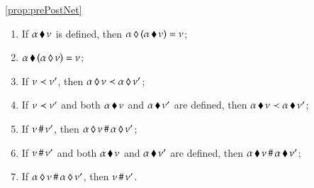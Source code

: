 \begin{lemmaa}{\ref{prop:prePostNet}}{\begin{enumerate}
\item  If ${\alpha}\,\blacklozenge\,{\nu}$ is defined, then
  ${\alpha}\,\lozenge\,{({\alpha}\,\blacklozenge\,{\nu})}=\nu$;
\item 
${\alpha}\,\blacklozenge\,{({\alpha}\,\lozenge\,{\nu})}=\nu$;
 \item   If  $\nu\prec \nu'$, 
then ${\alpha}\,\lozenge\,{\nu}\prec {\alpha}\,\lozenge\,{\nu'}$;
\item  If  $\nu\prec \nu'$ and both ${\alpha}\,\blacklozenge\,{\nu}$ and
  ${\alpha}\,\blacklozenge\,{\nu'}$ are defined, then
  ${\alpha}\,\blacklozenge\,{\nu}\prec {\alpha}\,\blacklozenge\,{\nu'}$; 
\item If  $\nu\,\#\, \nu'$, then ${\alpha}\,\lozenge\,{\nu}\,\#\,
  {\alpha}\,\lozenge\,{\nu'}$;
\item  If  $\nu\,\#\,
  \nu'$ and both ${\alpha}\,\blacklozenge\,{\nu}$ and ${\alpha}\,\blacklozenge\,{\nu'}$
  are defined, then ${\alpha}\,\blacklozenge\,{\nu}\,\#\,{\alpha}\,\blacklozenge\,{\nu'}$;
  \item  If  ${\alpha}\,\lozenge\,{\nu}\,\#\,
  {\alpha}\,\lozenge\,{\nu'}$, then $\nu\,\#\, \nu'$.
\end{enumerate}}\end{lemmaa}

